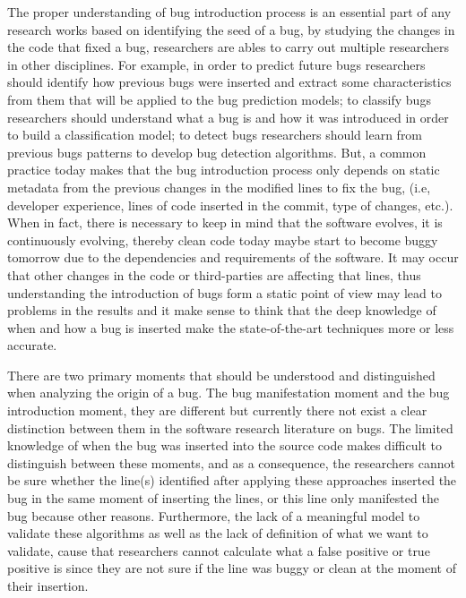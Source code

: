 \documentclass[a4paper, 12pt]{book}
\begin{document}
The proper understanding of bug introduction process is an essential part of any research works based on identifying the seed of a bug, by studying the changes in the code that fixed a bug, researchers are ables to carry out multiple researchers in other disciplines. For example, in order to predict future bugs researchers should identify how previous bugs were inserted and extract some characteristics from them that will be applied to the bug prediction models; to classify bugs researchers should understand what a bug is and how it was introduced in order to build a classification model; to detect bugs researchers should learn from previous bugs patterns to develop bug detection algorithms. But, a common practice today makes that the bug introduction process only depends on static metadata from the previous changes in the modified lines to fix the bug, (i.e, developer experience, lines of code inserted in the commit, type of changes, etc.). When in fact, there is necessary to keep in mind that the software evolves, it is continuously evolving, thereby clean code today maybe start to become buggy tomorrow due to the dependencies and requirements of the software. It may occur that other changes in the code or third-parties are affecting that lines, thus understanding the introduction of bugs form a static point of view may lead to problems in the results and it make sense to think that the deep knowledge of when and how a bug is inserted make the state-of-the-art techniques more or less accurate. %

There are two primary moments that should be understood and distinguished when analyzing the origin of a bug. The bug manifestation moment and the bug introduction moment, they are different but currently there not exist a clear distinction between them in the software research literature on bugs. The limited knowledge of when the bug was inserted into the source code makes difficult to distinguish between these moments, and as a consequence, the researchers cannot be sure whether the line(s) identified after applying these approaches inserted the bug in the same moment of inserting the lines, or this line only manifested the bug because other reasons. Furthermore, the lack of a meaningful model to validate these algorithms as well as the lack of definition of what we want to validate, cause that researchers cannot calculate what a false positive or true positive is since they are not sure if the line was buggy or clean at the moment of their insertion.
\end{document}
